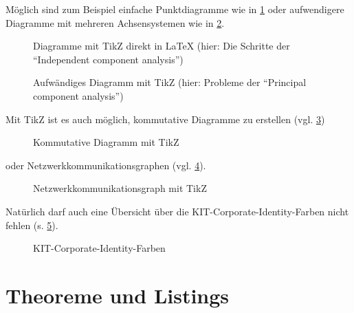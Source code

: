 Möglich sind zum Beispiel einfache Punktdiagramme wie in \cref{fig:ica} oder
aufwendigere Diagramme mit mehreren Achsensystemen wie in \cref{fig:pca}.
\begin{figure}[tbp]\centering
{} \quad
{} \quad
{}
\caption{Diagramme mit TikZ direkt in LaTeX (hier: Die Schritte der \enquote{Independent component analysis})}
\label{fig:ica}
\end{figure}
\begin{figure}[tbp]\centering
{} \quad
{}
\caption{Aufwändiges Diagramm mit TikZ (hier: Probleme der \enquote{Principal component analysis})}
\label{fig:pca}
\end{figure}
Mit TikZ ist es auch möglich, kommutative Diagramme zu erstellen (vgl. \cref{fig:kpca})
\begin{figure}[tbp]\centering
	
	\caption{Kommutative Diagramm mit TikZ}
  \label{fig:kpca}
\end{figure}
oder Netzwerkkommunikationsgraphen (vgl. \cref{fig:net-comm}).
\begin{figure}[tbp]\centering
	
	\caption{Netzwerkkommunikationsgraph mit TikZ}
  \label{fig:net-comm}
\end{figure}
Natürlich darf auch eine Übersicht über die KIT-Corporate-Identity-Farben
nicht fehlen (s. \cref{fig:kit-colors}).
\begin{figure}[tbp]\centering
	
	\caption{KIT-Corporate-Identity-Farben}
  \label{fig:kit-colors}
\end{figure}

\section{Theoreme und Listings}

